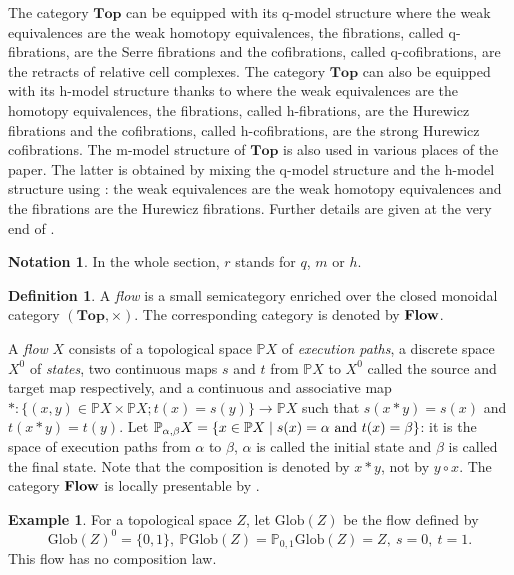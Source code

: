\documentclass[a4paper,12pt]{amsart}
\newcommand{\p}{\times}
\theoremstyle{definition}
\newtheorem{defn}[thm]{Definition}
\newtheorem{exa}[thm]{Example}
\newcommand{\bd}{\begin{defn}}
\newcommand{\ed}{\end{defn}}
\newtheorem{nota}[thm]{Notation}
\renewcommand{\top}{{\mathbf{Top}}}
\newcommand{\brm}[1]{{\rm{\mathbf{#1}}}}
\newcommand{\dtop}{{\brm{Flow}}}
\newcommand{\glob}{{\mathrm{Glob}}}
\renewcommand{\P}{\mathbb{P}}
\begin{document}
The category $\top$ can be equipped with its q-model structure where the weak equivalences are the weak homotopy equivalences, the fibrations, called q-fibrations, are the Serre fibrations and the cofibrations, called q-cofibrations, are the retracts of relative cell complexes. The category $\top$ can also be equipped with its h-model structure thanks to \cite[Corollary~5.23]{Barthel-Riel} where the weak equivalences are the homotopy equivalences, the fibrations, called h-fibrations, are the Hurewicz fibrations and the cofibrations, called h-cofibrations, are the strong Hurewicz cofibrations. The m-model structure of $\top$ is also used in various places of the paper. The latter is obtained by mixing the q-model structure and the h-model structure using \cite[Theorem~2.1]{mixed-cole}: the weak equivalences are the weak homotopy equivalences and the fibrations are the Hurewicz fibrations. Further details are given at the very end of \cite[Appendix~B]{leftproperflow}.

\begin{nota}
	In the whole section, $r$ stands for $q$, $m$ or $h$.
\end{nota}


\bd \cite[Definition~4.11]{model3} \label{def-flow}
A \textit{flow} is a small semicategory enriched over the closed monoidal category $(\top,\p)$. The corresponding category is denoted by $\dtop$. 
\ed

A \textit{flow} $X$ consists of a topological space $\P X$ of \textit{execution paths}, a discrete space $X^0$ of \textit{states}, two continuous maps $s$ and $t$ from $\P X$ to $X^0$ called the source and target map respectively, and a continuous and associative map $*:\{(x,y)\in \P X\p \P X; t(x)=s(y)\}\longrightarrow \P X$ such that $s(x*y)=s(x)$ and $t(x*y)=t(y)$. Let $\P_{\alpha,\beta}X = \{x\in \P X\mid s(x)=\alpha \hbox{ and } t(x)=\beta\}$: it is the space of execution paths from $\alpha$ to $\beta$, $\alpha$ is called the initial state and $\beta$ is called the final state. Note that the composition is denoted by $x*y$, not by $y\circ x$. The category $\dtop$ is locally presentable by \cite[Theorem~6.11]{Moore1}.

\begin{exa}
	For a topological space $Z$, let $\glob(Z)$ be the flow defined by 
	\[
	\glob(Z)^0=\{0,1\}, \ 
	\P \glob(Z)= \P_{0,1} \glob(Z)=Z,\ 
	s=0,\  t=1.
	\]
	This flow has no composition law.
\end{exa}
\end{document}
